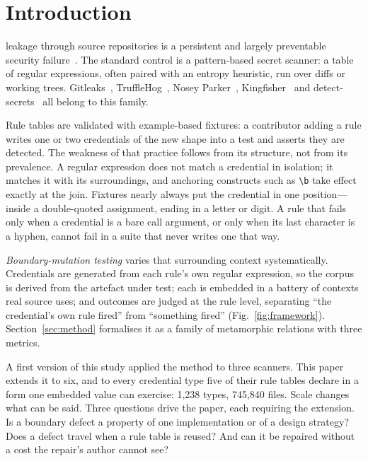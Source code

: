 \documentclass[10pt,journal,compsoc]{IEEEtran}
\begin{document}
\maketitle
\IEEEdisplaynontitleabstractindextext
\IEEEpeerreviewmaketitle

\section{Introduction}
\label{sec:intro}

 leakage through source repositories is a persistent and largely preventable security failure~\cite{meli2019}. The standard control is a pattern-based secret scanner: a table of regular expressions, often paired with an entropy heuristic, run over diffs or working trees. Gitleaks~\cite{gitleaks}, TruffleHog~\cite{trufflehog}, Nosey Parker~\cite{noseyparker}, Kingfisher~\cite{kingfisher} and detect-secrets~\cite{detectsecrets} all belong to this family.

Rule tables are validated with example-based fixtures: a contributor adding a rule writes one or two credentials of the new shape into a test and asserts they are detected. The weakness of that practice follows from its structure, not from its prevalence. A regular expression does not match a credential in isolation; it matches it with its surroundings, and anchoring constructs such as \verb|\b| take effect exactly at the join. Fixtures nearly always put the credential in one position---inside a double-quoted assignment, ending in a letter or digit. A rule that fails only when a credential is a bare call argument, or only when its last character is a hyphen, cannot fail in a suite that never writes one that way.

\emph{Boundary-mutation testing} varies that surrounding context systematically. Credentials are generated from each rule's own regular expression, so the corpus is derived from the artefact under test; each is embedded in a battery of contexts real source uses; and outcomes are judged at the rule level, separating ``the credential's own rule fired'' from ``something fired'' (Fig.~\ref{fig:framework}). Section~\ref{sec:method} formalises it as a family of metamorphic relations with three metrics.

A first version of this study applied the method to three scanners. This paper extends it to six, and to every credential type five of their rule tables declare in a form one embedded value can exercise: 1{,}238 types, 745{,}840 files. Scale changes what can be said. Three questions drive the paper, each requiring the extension. Is a boundary defect a property of one implementation or of a design strategy? Does a defect travel when a rule table is reused? And can it be repaired without a cost the repair's author cannot see?
\end{document}

